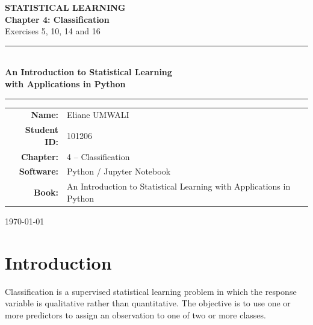 \documentclass[12pt,a4paper]{article}
\begin{document}
\begin{titlepage}

\centering

\vspace*{1.5cm}

{\Large \textbf{STATISTICAL LEARNING}}\\[0.5cm]

{\Huge \textbf{Chapter 4: Classification}}\\[0.5cm]

{\Large Exercises 5, 10, 14 and 16}\\[1.5cm]

\rule{\textwidth}{0.5pt}\\[0.5cm]

{\Large \textbf{An Introduction to Statistical Learning\\
with Applications in Python}}\\[0.5cm]

\rule{\textwidth}{0.5pt}

\vfill

\begin{tabular}{rl}
\textbf{Name:} & Eliane UMWALI \\[0.3cm]
\textbf{Student ID:} & 101206 \\[0.3cm]
\textbf{Chapter:} & 4 -- Classification \\[0.3cm]
\textbf{Software:} & Python / Jupyter Notebook \\[0.3cm]
\textbf{Book:} & An Introduction to Statistical Learning with Applications in Python
\end{tabular}

\vfill

{\large \today}

\end{titlepage}


\tableofcontents
\newpage


\section{Introduction}

Classification is a supervised statistical learning problem in which the
response variable is qualitative rather than quantitative. The objective is
to use one or more predictors to assign an observation to one of two or
more classes.
\end{document}
